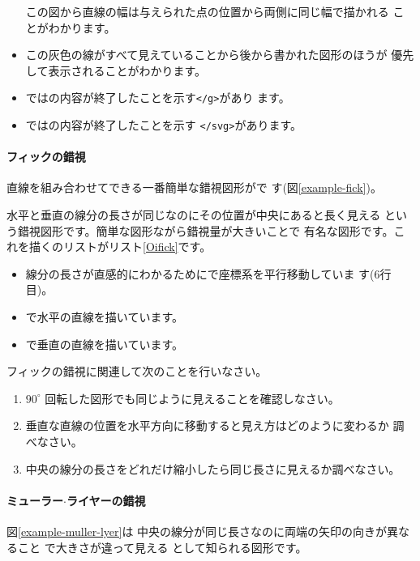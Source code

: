 \begin{itemize}
       この図から直線の幅は与えられた点の位置から両側に同じ幅で描かれる
       ことがわかります。
 \item この灰色の線がすべて見えていることから後から書かれた図形のほうが
       優先して表示されることがわかります。
 \item {}ではの内容が終了したことを示す\texttt{</g>}があり
       ます。
 \item {}ではの内容が終了したことを示す
       \texttt{</svg>}があります。
\end{itemize}
\paragraph{フィックの錯視}
直線を組み合わせてできる一番簡単な錯視図形がで
す(図\ref{example-fick})。


水平と垂直の線分の長さが同じなのにその位置が中央にあると長く見える
 という錯視図形です。簡単な図形ながら錯視量が大きいことで
 有名な図形です。これを描く\SVG のリストがリスト\ref{Oifick}です。
{}
\begin{itemize}
 \item 線分の長さが直感的にわかるためにで座標系を平行移動していま
       す(6行目)。
 \item {}で水平の直線を描いています。
 \item  {}で垂直の直線を描いています。
\end{itemize}
\begin{Problem}\upshape
フィックの錯視に関連して次のことを行いなさい。
\begin{enumerate}
 \item $90^{\circ}$ 回転した図形でも同じように見えることを確認しなさい。
 \item 垂直な直線の位置を水平方向に移動すると見え方はどのように変わるか
       調べなさい。
 \item 中央の線分の長さをどれだけ縮小したら同じ長さに見えるか調べなさい。 
\end{enumerate}
\end{Problem}
\paragraph{ミューラー$\cdot$ライヤーの錯視}
図\ref{example-muller-lyer}は
中央の線分が同じ長さなのに両端の矢印の向きが異なること
で大きさが違って見える
として知られる図形です。

